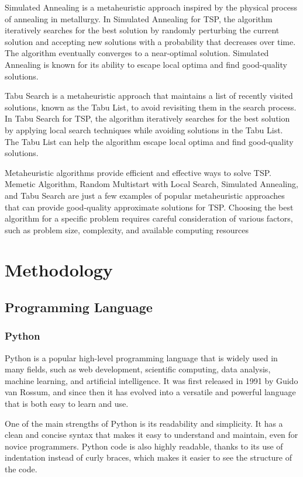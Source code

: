 \documentclass[conference]{IEEEtran}
\begin{document}
Simulated Annealing is a metaheuristic approach inspired by the physical process of annealing in metallurgy. In Simulated Annealing for TSP, the algorithm iteratively searches for the best solution by randomly perturbing the current solution and accepting new solutions with a probability that decreases over time. The algorithm eventually converges to a near-optimal solution. Simulated Annealing is known for its ability to escape local optima and find good-quality solutions.

Tabu Search is a metaheuristic approach that maintains a list of recently visited solutions, known as the Tabu List, to avoid revisiting them in the search process. In Tabu Search for TSP, the algorithm iteratively searches for the best solution by applying local search techniques while avoiding solutions in the Tabu List. The Tabu List can help the algorithm escape local optima and find good-quality solutions.

Metaheuristic algorithms provide efficient and effective ways to solve TSP. Memetic Algorithm, Random Multistart with Local Search, Simulated Annealing, and Tabu Search are just a few examples of popular metaheuristic approaches that can provide good-quality approximate solutions for TSP. Choosing the best algorithm for a specific problem requires careful consideration of various factors, such as problem size, complexity, and available computing resources

\section{Methodology}

\subsection{Programming Language}

\subsubsection{Python}
Python is a popular high-level programming language that is widely used in many fields, such as web development, scientific computing, data analysis, machine learning, and artificial intelligence. It was first released in 1991 by Guido van Rossum, and since then it has evolved into a versatile and powerful language that is both easy to learn and use.

One of the main strengths of Python is its readability and simplicity. It has a clean and concise syntax that makes it easy to understand and maintain, even for novice programmers. Python code is also highly readable, thanks to its use of indentation instead of curly braces, which makes it easier to see the structure of the code.
\end{document}
